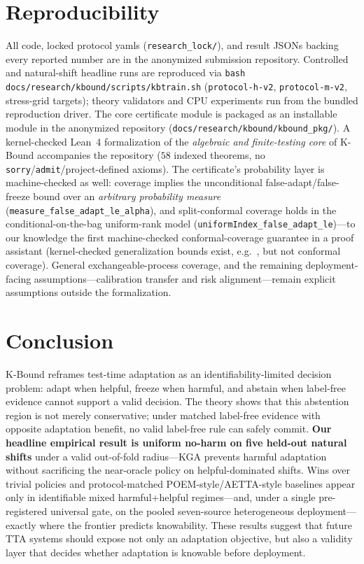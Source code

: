 \documentclass[conference]{IEEEtran}
\theoremstyle{plain}
\theoremstyle{definition}
\theoremstyle{remark}
\begin{document}
\section{Reproducibility}\label{sec:repro-main}
All code, locked protocol yamls (\texttt{research\_lock/}), and result JSONs backing every
reported number are in the anonymized submission repository. Controlled and natural-shift
headline runs are reproduced via \texttt{bash docs/research/kbound/scripts/kbtrain.sh}
(\texttt{protocol-h-v2}, \texttt{protocol-m-v2}, stress-grid targets); theory validators and
CPU experiments run from the bundled reproduction driver. The core certificate module is
packaged as an installable module in the anonymized repository (\texttt{docs/research/kbound/kbound\_pkg/}).
A kernel-checked Lean~4 formalization of the \emph{algebraic and finite-testing core} of K-Bound
accompanies the repository ($58$ indexed theorems, no \texttt{sorry}/\texttt{admit}/project-defined
axioms). The certificate's probability layer is machine-checked as well: coverage implies the
unconditional false-adapt/false-freeze bound over an \emph{arbitrary probability measure}
(\texttt{measure\_false\_adapt\_le\_alpha}), and split-conformal coverage holds in the
conditional-on-the-bag uniform-rank model
(\texttt{uniformIndex\_false\_adapt\_le})---to our knowledge the first machine-checked
conformal-coverage guarantee in a proof assistant (kernel-checked generalization bounds exist,
e.g.~\cite{zhang2025leanrademacher}, but not conformal coverage). General exchangeable-process
coverage, and the remaining deployment-facing assumptions---calibration transfer and risk
alignment---remain explicit assumptions outside the formalization.

\section{Conclusion}
K-Bound reframes test-time adaptation as an identifiability-limited decision problem: adapt
when helpful, freeze when harmful, and abstain when label-free evidence cannot support a valid
decision. The theory shows that this abstention region is not merely conservative; under matched
label-free evidence with opposite adaptation benefit, no valid label-free rule can safely commit.
\textbf{Our headline empirical result is uniform no-harm on five held-out natural shifts} under a
valid out-of-fold radius---\textsc{KGA} prevents harmful adaptation without sacrificing the
near-oracle policy on helpful-dominated shifts. Wins over trivial policies and protocol-matched
POEM-style/AETTA-style baselines appear only in identifiable mixed harmful+helpful regimes---and,
under a single pre-registered universal gate, on the pooled seven-source heterogeneous
deployment---exactly where the frontier predicts knowability.
These results suggest that future TTA systems should expose not only an adaptation objective, but
also a validity layer that decides whether adaptation is knowable before deployment.

\appendix



\end{document}
